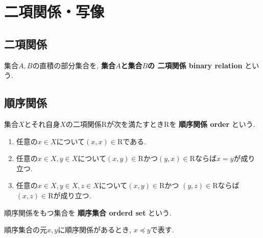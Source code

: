 \section{二項関係・写像}
\subsection{二項関係}
\begin{Def}
集合$A,B$の直積の部分集合を, 
{\bf 集合$A$と集合$B$の
二項関係 binary relation}
という.
\end{Def}

\subsection{順序関係}
\begin{Def}
集合$X$とそれ自身$X$の二項関係$\mathrm{R}$が次を満たすとき$\mathrm{R}$を
{\bf 順序関係 order}
という.
\begin{enumerate}
\item 任意の$x\in X$について$(x,x)\in \mathrm{R}$である.
\item 任意の$x\in X,y\in X$について$(x,y)\in \mathrm{R}$かつ$(y,x)\in \mathrm{R}$ならば$x=y$が成り立つ.
\item 任意の$x\in X,y\in X,z\in X$について$(x,y)\in \mathrm{R}$かつ $(y,z)\in \mathrm{R}$ならば
$(x,z)\in \mathrm{R}$が成り立つ.
\end{enumerate}
\end{Def}
\begin{Def}
順序関係をもつ集合を
{\bf 順序集合 orderd set}
という.
\end{Def}
\begin{Notation}
順序集合の元$x,y$に順序関係があるとき, $x\preceq y$で表す.
\end{Notation}
